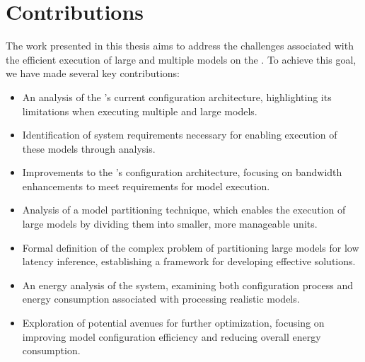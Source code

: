 \section{Contributions}
The work presented in this thesis aims to address the challenges associated with the efficient execution of large and multiple models on the \graicore{}.
To achieve this goal, we have made several key contributions:
\begin{itemize}
    \item 
    An analysis of the \graicore{}'s current configuration architecture, highlighting its limitations when executing multiple and large models.
    \item
    Identification of system requirements necessary for enabling execution of these models through analysis.
    \item
    Improvements to the \graicore{}'s configuration architecture, focusing on bandwidth enhancements to meet requirements for model execution.
    \item
    Analysis of a model partitioning technique, which enables the execution of large models by dividing them into smaller, more manageable units.
    \item
    Formal definition of the complex problem of partitioning large models for low latency inference, establishing a framework for developing effective solutions.
    \item
    An energy analysis of the system, examining both configuration process and energy consumption associated with processing realistic models.
    \item
    Exploration of potential avenues for further optimization, focusing on improving model configuration efficiency and reducing overall energy consumption.
\end{itemize}